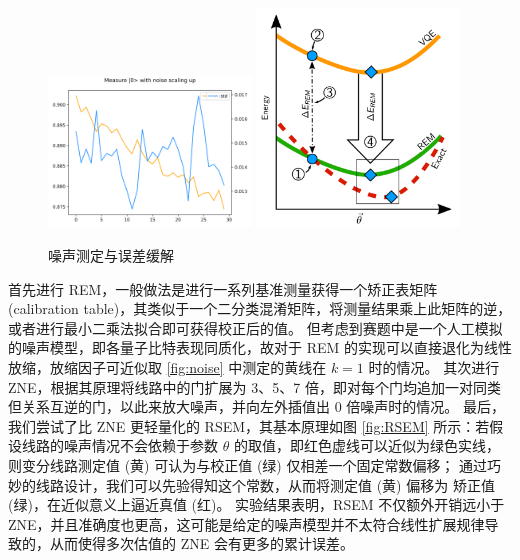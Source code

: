 \documentclass[withoutpreface,bwprint]{cumcmthesis}
\begin{document}
\begin{figure}
	\centering
	{\includegraphics[width=0.48\textwidth]{figures/vis_noise_scale.png}}
	{\includegraphics[width=0.48\textwidth]{figures/RSEM.png}}
	\caption{噪声测定与误差缓解}
\end{figure}

首先进行 REM，一般做法是进行一系列基准测量获得一个矫正表矩阵 (calibration table)，其类似于一个二分类混淆矩阵，将测量结果乘上此矩阵的逆，或者进行最小二乘法拟合即可获得校正后的值。
但考虑到赛题中是一个人工模拟的噪声模型，即各量子比特表现同质化，故对于 REM 的实现可以直接退化为线性放缩，放缩因子可近似取 \ref{fig:noise} 中测定的黄线在 $ k = 1 $ 时的情况。
其次进行 ZNE，根据其原理将线路中的门扩展为 3、5、7 倍，即对每个门均追加一对同类但关系互逆的门，以此来放大噪声，并向左外插值出 0 倍噪声时的情况。
最后，我们尝试了比 ZNE 更轻量化的 RSEM，其基本原理如图 \ref{fig:RSEM} 所示：若假设线路的噪声情况不会依赖于参数 $ \theta $ 的取值，即红色虚线可以近似为绿色实线，则变分线路测定值 (黄) 可认为与校正值 (绿) 仅相差一个固定常数偏移；
通过巧妙的线路设计，我们可以先验得知这个常数，从而将测定值 (黄) 偏移为 矫正值 (绿)，在近似意义上逼近真值 (红)。
实验结果表明，RSEM 不仅额外开销远小于 ZNE，并且准确度也更高，这可能是给定的噪声模型并不太符合线性扩展规律导致的，从而使得多次估值的 ZNE 会有更多的累计误差。
\end{document}
